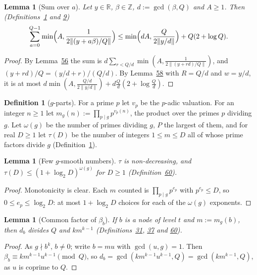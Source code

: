 \documentclass[11pt]{article}
\newcounter{hffc}
\theoremstyle{definition}\newtheorem{hffdef}[hffc]{Definition}
\theoremstyle{plain}\newtheorem{hfflem}[hffc]{Lemma}\newtheorem{hffthm}[hffc]{Theorem}
\theoremstyle{remark}\newtheorem{hffrem}[hffc]{Remark}
\newcommand{\hffcost}{}
\newcommand{\setcost}[1]{\renewcommand{\hffcost}{#1}}
\newcommand{\Z}{\mathbb{Z}}\newcommand{\R}{\mathbb{R}}\newcommand{\N}{\mathbb{N}}
\begin{document}
\begin{hfflem}[Sum over $a$]\label{L:asum}
Let $y\in\R$, $\beta\in\Z$, $d:=\gcd(\beta,Q)$ and $A\ge1$. Then (Definitions~\hyperref[D:conv]{1} and \hyperref[D:psi]{9}) \[\sum_{a=0}^{Q-1}\min\Bigl(A,\frac1{2\|(y+a\beta)/Q\|}\Bigr)\le\min\Bigl(dA,\frac Q{2\|y/d\|}\Bigr)+Q(2+\log Q).\]
\par\nopagebreak{}
\end{hfflem}
\begin{proof}\setcost{length 137/300}By Lemma~\hyperref[L:mult]{56} the sum is $d\sum_{r<Q/d}\min(A,\frac1{2\|(y+rd)/Q\|})$, and $(y+rd)/Q=(y/d+r)/(Q/d)$. By Lemma~\hyperref[L:ressum]{58} with $R=Q/d$ and $w=y/d$, it is at most $d\min(A,\frac{Q/d}{2\|y/d\|})+d\frac Qd(2+\log\frac Qd)$.
\end{proof}

\begin{hffdef}[$g$-parts]\label{D:gpart}
For a prime $p$ let $v_p$ be the $p$-adic valuation. For an integer $n\ge1$ let $m_g(n):=\prod_{p\mid g}p^{v_p(n)}$, the product over the primes $p$ dividing $g$. Let $\omega(g)$ be the number of primes dividing $g$, $P$ the largest of them, and for real $D\ge1$ let $\tau(D)$ be the number of integers $1\le m\le D$ all of whose prime factors divide $g$ (Definition~\hyperref[D:conv]{1}).
\par\nopagebreak{}
\end{hffdef}

\begin{hfflem}[Few $g$-smooth numbers]\label{L:tau}
$\tau$ is non-decreasing, and $\tau(D)\le(1+\log_2D)^{\omega(g)}$ for $D\ge1$ (Definition~\hyperref[D:gpart]{60}).
\par\nopagebreak{}
\end{hfflem}
\begin{proof}\setcost{length 109/300}Monotonicity is clear. Each $m$ counted is $\prod_{p\mid g}p^{e_p}$ with $p^{e_p}\le D$, so $0\le e_p\le\log_2D$: at most $1+\log_2D$ choices for each of the $\omega(g)$ exponents.
\end{proof}

\begin{hfflem}[Common factor of $\beta_b$]\label{L:gcd}
If $b$ is a node of level $t$ and $m:=m_g(b)$, then $d_b$ divides $Q$ and $km^{k-1}$ (Definitions~\hyperref[D:node]{31}, \hyperref[D:phase]{37} and \hyperref[D:gpart]{60}).
\par\nopagebreak{}
\end{hfflem}
\begin{proof}\setcost{length 110/300}As $g\nmid b^k$, $b\ne0$; write $b=mu$ with $\gcd(u,g)=1$. Then $\beta_b\equiv km^{k-1}u^{k-1}\pmod Q$, so $d_b=\gcd(km^{k-1}u^{k-1},Q)=\gcd(km^{k-1},Q)$, as $u$ is coprime to $Q$.
\end{proof}
\end{document}
